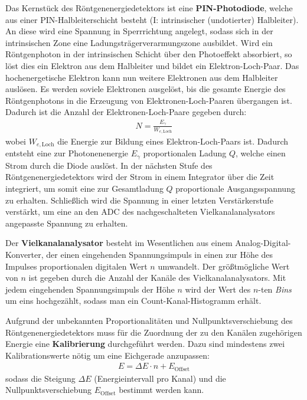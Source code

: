 \documentclass[11pt, a4paper]{article}
\begin{document}
Das Kernstück des Röntgenenergiedetektors ist eine \textbf{PIN-Photodiode}, welche aus einer PIN-Halbleiterschicht besteht (I: intrinsischer (undotierter) Halbleiter).
An diese wird eine Spannung in Sperrrichtung angelegt, sodass sich in der intrinsischen Zone eine Ladungsträgerverarmungszone ausbildet.
Wird ein Röntgenphoton in der intrinsischen Schicht über den Photoeffekt absorbiert, so löst dies ein Elektron aus dem Halbleiter und bildet ein Elektron-Loch-Paar.
Das hochenergetische Elektron kann nun weitere Elektronen aus dem Halbleiter auslösen.
Es werden soviele Elektronen ausgelöst, bis die gesamte Energie des Röntgenphotons in die Erzeugung von Elektronen-Loch-Paaren übergangen ist.
Dadurch ist die Anzahl der Elektronen-Loch-Paare gegeben durch:
\begin{align}
  N = \frac{E_\gamma}{W_{e,\mathrm{Loch}}}
\end{align}
wobei $W_{e,\mathrm{Loch}}$ die Energie zur Bildung eines Elektron-Loch-Paars ist.
Dadurch entsteht eine zur Photonenenergie $E_\gamma$ proportionalen Ladung $Q$, welche einen Strom durch die Diode auslöst.
In der nächsten Stufe des Röntgenenergiedetektors wird der Strom in einem Integrator über die Zeit integriert, um somit eine zur Gesamtladung $Q$ proportionale Ausgangsspannung zu erhalten.
Schließlich wird die Spannung in einer letzten Verstärkerstufe verstärkt, um eine an den ADC des nachgeschalteten Vielkanalanalysators angepasste Spannung zu erhalten.

Der \textbf{Vielkanalanalysator} besteht im Wesentlichen aus einem Analog-Digital-Konverter, der einen eingehenden Spannungsimpuls in einen zur Höhe des Impulses proportionalen digitalen Wert $n$ umwandelt.
Der größtmögliche Wert von $n$ ist gegeben durch die Anzahl der Kanäle des Vielkanalanalysators.
Mit jedem eingehenden Spannungsimpuls der Höhe $n$ wird der Wert des $n$-ten \emph{Bins} um eins hochgezählt, sodass man ein Count-Kanal-Histogramm erhält.

Aufgrund der unbekannten Proportionalitäten und Nullpunktsverschiebung des Röntgenenergiedetektors muss für die Zuordnung der zu den Kanälen zugehörigen Energie eine \textbf{Kalibrierung} durchgeführt werden.
Dazu sind mindestens zwei Kalibrationswerte nötig um eine Eichgerade anzupassen:
\begin{align}
  E = \Delta E \cdot n + E_\mathrm{Offset}
  \label{eq:kalibrierung}
\end{align}
sodass die Steigung $\Delta E$ (Energieintervall pro Kanal) und die Nullpunktsverschiebung $E_\mathrm{Offset}$ bestimmt werden kann.
\end{document}
